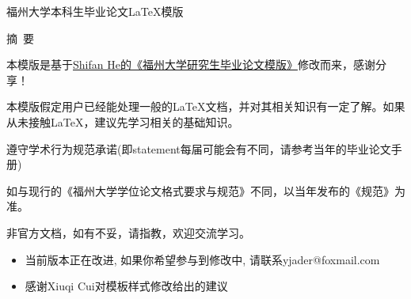 \pagestyle{plain}{%
    \fancyhf{} %
    \fancyfoot[C]{\thepage}%
    \renewcommand{\headrulewidth}{0pt}
    \renewcommand{\footrulewidth}{0pt}}

\vspace{17pt}
\begin{center}
    {\heitib \xiaoerhao
        \setlength{\baselineskip}{20pt}
        福州大学本科生毕业论文\LaTeX 模版
    }
    \vspace{30pt}
\end{center}

\begin{center}
    {\heitib \sihao 摘~要}
    \vspace{12pt}
\end{center}

\songti \xiaosihao
\setlength{\baselineskip}{20pt}

本模版是基于\href{https://www.overleaf.com/latex/templates/fu-zhou-da-xue-yan-jiu-sheng-bi-ye-lun-wen-mo-ban/pdccsztcptxy}{Shifan He的《福州大学研究生毕业论文模版》}修改而来，感谢分享！

本模版假定用户已经能处理一般的\LaTeX 文档，并对其相关知识有一定了解。如果从未接触\LaTeX，建议先学习相关的基础知识。

遵守学术行为规范承诺(即statement每届可能会有不同，请参考当年的毕业论文手册)

如与现行的《福州大学学位论文格式要求与规范》不同，以当年发布的《规范》为准。

非官方文档，如有不妥，请指教，欢迎交流学习。

\begin{itemize}
    \item 当前版本正在改进, 如果你希望参与到修改中, 请联系yjader@foxmail.com
    \item 感谢Xiuqi Cui对模板样式修改给出的建议
\end{itemize}


